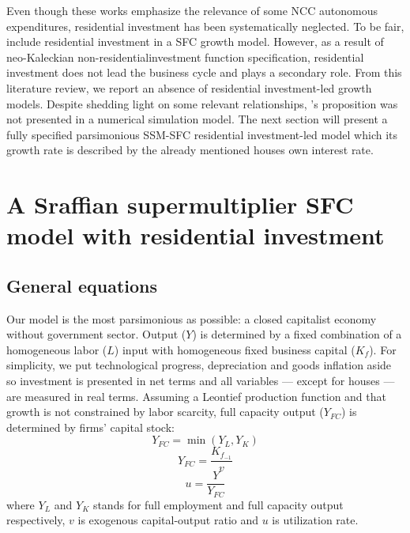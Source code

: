 \documentclass[11pt]{article}
\begin{document}
Even though these works emphasize the relevance of some NCC autonomous expenditures, residential investment has been systematically neglected.
To be fair, \textcites{zezza_u.s._2008}{nikolaidi_securitisation_2015} include residential investment in a SFC growth model.
However, as a result of neo-Kaleckian non-residentialinvestment function specification, residential investment does not lead the business cycle and plays a secondary role.
From this literature review, we report an absence of residential investment-led growth models. 
Despite shedding light on some relevant relationships, \citeauthor*{teixeira_crescimento_2015}'s \citeyear{teixeira_crescimento_2015} proposition was not presented in a numerical simulation model.
The next section will present a fully specified parsimonious SSM-SFC residential investment-led model 
which its growth rate is described by the already mentioned houses own interest rate.


\section{A Sraffian supermultiplier SFC model with residential investment}
\label{sec:org05248d6}
\label{sec:Model}
\subsection{General equations}
\label{sec:orgba24deb}

Our model is the most parsimonious as possible: a closed capitalist economy without government sector. Output (\(Y\)) is determined by  a fixed combination of a homogeneous labor (\(L\)) input with homogeneous fixed business capital (\(K_f\)). 
For simplicity, we put technological progress, depreciation and goods inflation aside so investment is presented in net terms and all variables --- except for houses --- are measured in real terms.
Assuming a Leontief production function and that growth is not constrained by labor scarcity, full capacity output (\(Y_{FC}\)) is
determined by firms' capital stock:
\begin{equation}
\label{_Leontieff}
    Y_{FC} = \min (Y_L, Y_K)
\end{equation}
\begin{equation}
\label{_YFC}
    Y_{FC} = \frac{K_{f_{-1}}}{v}
\end{equation}
\begin{equation}
\label{_u}
    u = \frac{Y}{Y_{FC}}
\end{equation}
where \(Y_L\) and \(Y_K\) stands for full employment and full capacity output respectively, \(v\) is exogenous capital-output ratio and \(u\) is utilization rate.
\end{document}
